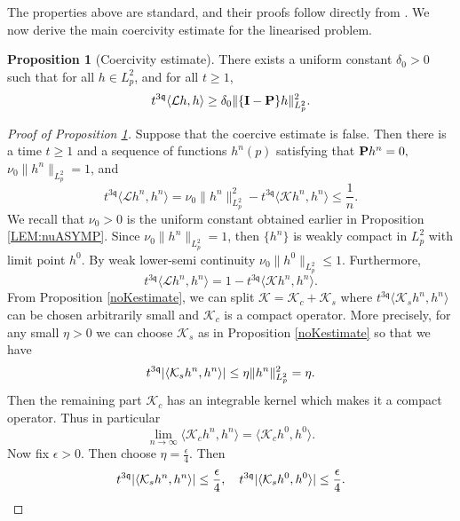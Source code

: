 \documentclass[reqno]{amsart}
\newcommand{\pv}{p}
\newcommand{\qq}{\mathfrak{q}}
\newcommand{\tTq}{t^{3\qq}}
\newcommand{\compK}{\mathcal{K}}
\newcommand{\linL}{\mathcal{L}}
\newcommand{\macro}{{\bf P}}
\newcommand{\micro}{{\bf \{I- P\}}}
\theoremstyle{definition}
\newtheorem{proposition}[theorem]{Proposition}
\numberwithin{equation}{section}
\numberwithin{theorem}{section}
\begin{document}
    The properties above are standard, and their proofs follow directly from \cite{GL1996}. We now derive the main coercivity estimate for the linearised problem.


\begin{proposition}[Coercivity estimate]\label{lowerN}  
There exists a uniform constant
$\delta_0>0$ such that for all \(h\in L^2_p\), and for all \(t\geq 1\),
\begin{equation}\label{coercestprop2}
  \tTq\langle \linL h, h \rangle
\geq
\delta_0 
\| \micro  h \|_{L^2_p}^2.
\end{equation}
\end{proposition}



\begin{proof}[Proof of Proposition \ref{lowerN}]
Suppose that the coercive estimate is false.  Then there is a time \(t\geq 1\) and a sequence of functions $h^n(\pv)$ satisfying that
$
\macro h^n = 0,
$ 
$\nu_0\| h^n \|_{L^2_p}=1$,
and
$$
\tTq\langle {\linL} h^n, h^n \rangle
=
\nu_0\| h^n \|_{L^2_p}^2
- 
\tTq\langle {\compK} h^n, h^n \rangle
\le \frac{1}{n}.
$$ We recall that \(\nu_0>0\) is the uniform constant obtained earlier in Proposition \ref{LEM:nuASYMP}.
Since $\nu_0\| h^n \|_{L^2_p}=1$, then 
 $ \{ h^n \} $ is weakly compact in ${L^2_p}$ with limit point $h^0$.  
By weak lower-semi continuity $\nu_0\| h^0 \|_{L^2_p} \le 1$.  Furthermore,
$$
\tTq\langle {\linL} h^n, h^n \rangle
=
1
- 
\tTq\langle {\compK} h^n, h^n \rangle.
$$ 
From Proposition \ref{noKestimate}, we can split $\compK = \compK_c + \compK_s$ where $\tTq\langle {\compK_s} h^n, h^n \rangle$ can be chosen arbitrarily small and $\compK_c$ is a compact operator.  More precisely, for any small $\eta>0$ we can choose $\compK_s$ as in Proposition \ref{noKestimate} so that we have 
\begin{equation}
\tTq |\langle   \compK_s h^n, h^n\rangle |
\le 
 \eta 
\| h^n\|_{L^2_p}^2 = \eta.
\notag
\end{equation}
Then the remaining part $\compK_c$ has an integrable kernel which makes it a compact operator.  Thus in particular
$$
\lim_{n\to\infty}
\langle {\compK}_c h^n, h^n \rangle
=
\langle {\compK}_c h^0, h^0 \rangle.
$$
Now fix $\epsilon>0$.  Then choose $\eta = \frac{\epsilon}{4}$.  Then 
\begin{equation}
\tTq |\langle   \compK_s h^n, h^n\rangle |
\le 
\frac{\epsilon}{4}, 
\quad 
\tTq |\langle   \compK_s h^0, h^0\rangle |
\le 
\frac{\epsilon}{4}.
\notag
\end{equation}

\end{proof}
\end{document}
